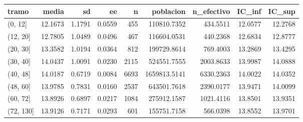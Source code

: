 \begin{tabular}{lrrrrrrrr}
\toprule
tramo & media & sd & ee & n & poblacion & n\_efectivo & IC\_inf & IC\_sup \\
\midrule
(0, 12] & 12.1673 & 1.1791 & 0.0559 & 455 & 110810.7352 & 434.5511 & 12.0577 & 12.2768 \\
(12, 20] & 12.7805 & 1.0489 & 0.0496 & 467 & 116604.0531 & 440.2368 & 12.6834 & 12.8777 \\
(20, 30] & 13.3582 & 1.0194 & 0.0364 & 812 & 199729.8614 & 769.4003 & 13.2869 & 13.4295 \\
(30, 40] & 14.0437 & 1.0091 & 0.0230 & 2115 & 524551.7555 & 2003.8633 & 13.9987 & 14.0888 \\
(40, 48] & 14.0187 & 0.6719 & 0.0084 & 6693 & 1659813.5141 & 6330.2363 & 14.0022 & 14.0352 \\
(48, 60] & 13.9785 & 0.7831 & 0.0160 & 2537 & 643501.7618 & 2390.0177 & 13.9471 & 14.0099 \\
(60, 72] & 13.8926 & 0.6897 & 0.0217 & 1084 & 275912.1587 & 1021.4116 & 13.8501 & 13.9351 \\
(72, 130] & 13.9126 & 0.7171 & 0.0293 & 601 & 155751.7158 & 566.0398 & 13.8552 & 13.9701 \\
\bottomrule
\end{tabular}
